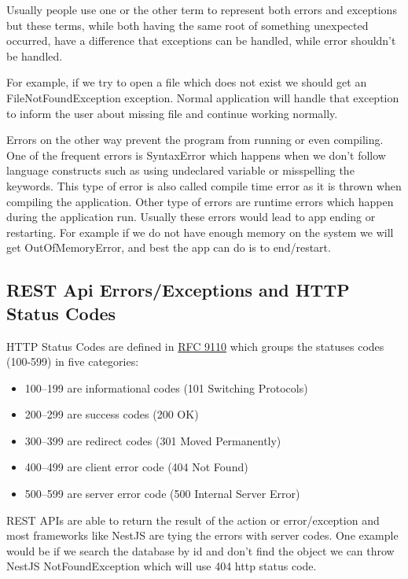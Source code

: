 Usually people use one or the other term to represent both errors and exceptions but these terms, while both having
the same root of something unexpected occurred, have a difference that exceptions can be handled,
while error shouldn't be handled.

For example, if we try to open a file which does not exist we should get an FileNotFoundException exception.
Normal application will handle that exception to inform the user about missing file and continue working normally.

Errors on the other way prevent the program from running or even compiling.
One of the frequent errors is SyntaxError which happens when we don't follow language constructs such as using
undeclared variable or misspelling the keywords.
This type of error is also called compile time error as it is thrown when compiling the application.
Other type of errors are runtime errors which happen during the application run.
Usually these errors would lead to app ending or restarting.
For example if we do not have enough memory on the system we will get OutOfMemoryError, and best the app can do
is to end/restart.

\subsection{REST Api Errors/Exceptions and HTTP Status Codes}
\label{subsec:rest-api-errors/exceptions-and-http-status-codes}

HTTP Status Codes are defined in \href{https://httpwg.org/specs/rfc9110.html#overview.of.status.codes}{RFC 9110}
which groups the statuses codes (100-599) in five categories:
\begin{itemize}
    \item 100--199 are informational codes (101 Switching Protocols)
    \item 200--299 are success codes (200 OK)
    \item 300--399 are redirect codes (301 Moved Permanently)
    \item 400--499 are client error code (404 Not Found)
    \item 500--599 are server error code (500 Internal Server Error)
\end{itemize}

REST APIs are able to return the result of the action or error/exception and most frameworks like NestJS are
tying the errors with server codes.
One example would be if we search the database by id and don't find the object we can throw NestJS NotFoundException
which will use 404 http status code.

